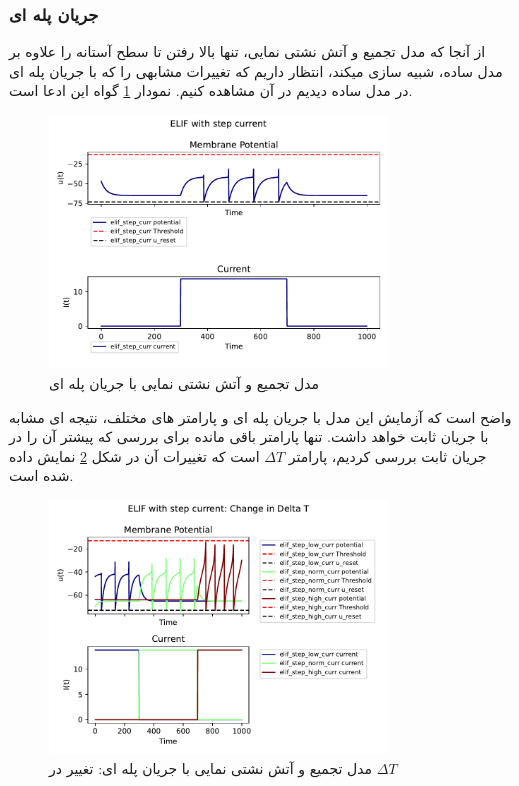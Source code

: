 \documentclass{article}
\begin{document}
            \subsubsection{جریان پله ای}
                از آنجا که مدل تجمیع و آتش نشتی نمایی، تنها بالا رفتن تا سطح آستانه را علاوه بر مدل ساده، شبیه سازی میکند، انتظار داریم که تغییرات مشابهی را که با جریان پله ای در مدل ساده دیدیم در آن مشاهده کنیم. نمودار
                \ref{fig:elif-step-curr}
                گواه این ادعا است.
                \begin{figure}[H]
                    \centering
                    \includegraphics[width=0.8\textwidth]{plots/ELIF with step current.pdf} 
                    \caption{مدل تجمیع و آتش نشتی نمایی با جریان پله ای }
                    \label{fig:elif-step-curr}
                \end{figure}
                واضح است که آزمایش این مدل با جریان پله ای و پارامتر های مختلف، نتیجه ای مشابه با جریان ثابت خواهد داشت.
                تنها پارامتر باقی مانده برای بررسی که پیشتر آن را در جریان ثابت بررسی کردیم، پارامتر
                $\Delta T$ 
                است که تغییرات آن در شکل 
                \ref{fig:elif-step-curr-change-T}
                نمایش داده شده است.
                \begin{figure}[H]
                    \centering
                    \includegraphics[width=0.8\textwidth]{plots/ELIF with step current: Change in Delta T.pdf} 
                    \caption{مدل تجمیع و آتش نشتی نمایی با جریان پله ای: تغییر در $\Delta T$}
                    \label{fig:elif-step-curr-change-T}
                \end{figure}
\end{document}
